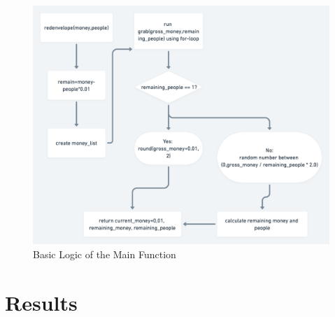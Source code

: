 \documentclass{scrartcl}
\begin{document}
\begin{figure}[H]
	\begin{center}
		\includegraphics[width=15cm]{stats210@2x.png}
	\end{center}
	\caption{Basic Logic of the Main Function}
	\label{code}
\end{figure}


\section{Results}\label{sec4}
\end{document}
